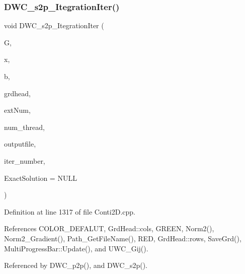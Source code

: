 \subsubsection{D\+W\+C\+\_\+s2p\+\_\+\+Itegration\+Iter()}
{\footnotesize\ttfamily void D\+W\+C\+\_\+s2p\+\_\+\+Itegration\+Iter (\begin{DoxyParamCaption}\item[{double $\ast$$\ast$}]{G,  }\item[{double $\ast$}]{x,  }\item[{double $\ast$}]{b,  }\item[{\textbf{ Grd\+Head}}]{grdhead,  }\item[{int}]{ext\+Num,  }\item[{int}]{num\+\_\+thread,  }\item[{string}]{outputfile,  }\item[{double}]{iter\+\_\+number,  }\item[{double $\ast$}]{Exact\+Solution = {\ttfamily NULL} }\end{DoxyParamCaption})}



Definition at line 1317 of file Conti2\+D.\+cpp.



References C\+O\+L\+O\+R\+\_\+\+D\+E\+F\+A\+L\+UT, Grd\+Head\+::cols, G\+R\+E\+EN, Norm2(), Norm2\+\_\+\+Gradient(), Path\+\_\+\+Get\+File\+Name(), R\+ED, Grd\+Head\+::rows, Save\+Grd(), Multi\+Progress\+Bar\+::\+Update(), and U\+W\+C\+\_\+\+Gij().



Referenced by D\+W\+C\+\_\+p2p(), and D\+W\+C\+\_\+s2p().

